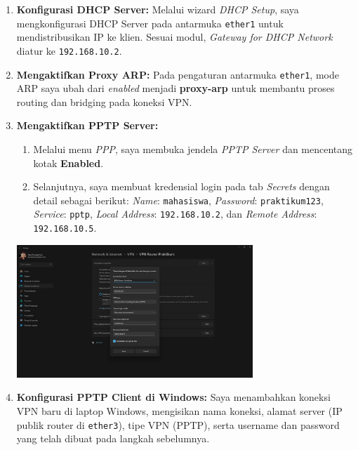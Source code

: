 \begin{enumerate}
    \item \textbf{Konfigurasi DHCP Server:} Melalui wizard \textit{DHCP Setup}, saya mengkonfigurasi DHCP Server pada antarmuka \texttt{ether1} untuk mendistribusikan IP ke klien. Sesuai modul, \textit{Gateway for DHCP Network} diatur ke \texttt{192.168.10.2}.
    
    \item \textbf{Mengaktifkan Proxy ARP:} Pada pengaturan antarmuka \texttt{ether1}, mode ARP saya ubah dari \textit{enabled} menjadi \textbf{proxy-arp} untuk membantu proses routing dan bridging pada koneksi VPN.
    
    \item \textbf{Mengaktifkan PPTP Server:}
    \begin{enumerate}[label*=\alph*.]
        \item Melalui menu \textit{PPP}, saya membuka jendela \textit{PPTP Server} dan mencentang kotak \textbf{Enabled}.
        \item Selanjutnya, saya membuat kredensial login pada tab \textit{Secrets} dengan detail sebagai berikut: \textit{Name}: \texttt{mahasiswa}, \textit{Password}: \texttt{praktikum123}, \textit{Service}: \texttt{pptp}, \textit{Local Address}: \texttt{192.168.10.2}, dan \textit{Remote Address}: \texttt{192.168.10.5}.
    \end{enumerate}
    \begin{center}
        \includegraphics[width=0.7\textwidth]{img5/PPTPSecret.jpeg} 
    \end{center}
    
    \item \textbf{Konfigurasi PPTP Client di Windows:} Saya menambahkan koneksi VPN baru di laptop Windows, mengisikan nama koneksi, alamat server (IP publik router di \texttt{ether3}), tipe VPN (PPTP), serta username dan password yang telah dibuat pada langkah sebelumnya.
    

\end{enumerate}
